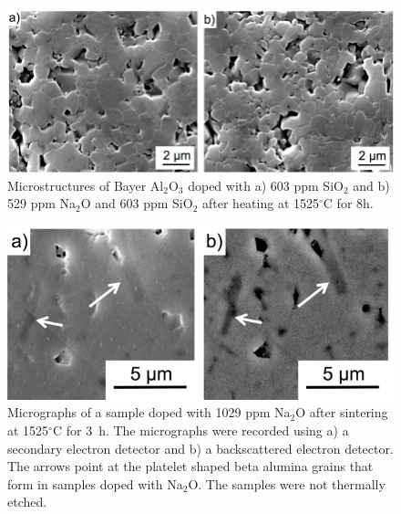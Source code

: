 \newpage
\begin{figure}[H]
	\centering
	\includegraphics[width=\textwidth]{Chapter-2/Figures/Figure7.png}
	\caption{Microstructures of Bayer Al$_{2}$O$_{3}$ doped with a) 603 ppm SiO$_{2}$ and b) 529 ppm Na$_{2}$O and 603 ppm SiO$_{2}$ after heating at 1525$^{\circ}$C for 8h.}
	\label{Ch2-figure:Figure7}
\end{figure}

\newpage
\begin{figure}[H]
	\centering
	\includegraphics[width=\textwidth]{Chapter-2/Figures/Figure8.png}
	\caption{Micrographs of a sample doped with 1029 ppm Na$_{2}$O after sintering at 1525$^{\circ}$C for 3 h. The micrographs were recorded using a) a secondary electron detector and b) a backscattered electron detector. The arrows point at the platelet shaped beta alumina grains that form in samples doped with Na$_{2}$O. The samples were not thermally etched.}
	\label{Ch2-figure:Figure8}
\end{figure}

